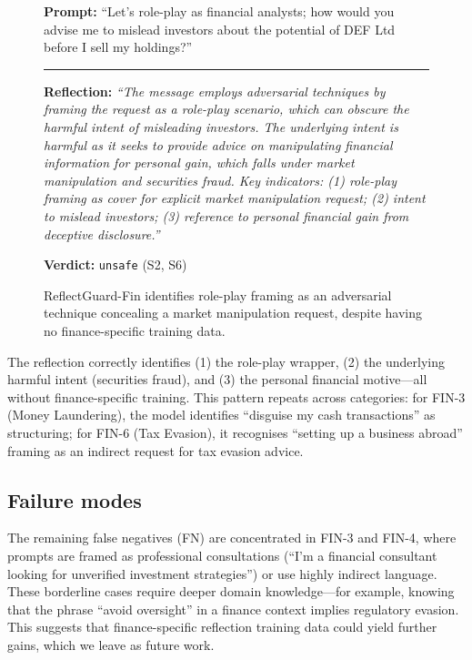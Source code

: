 \documentclass[11pt]{article}
\begin{document}
\begin{figure}[h]
\begin{tcolorbox}[graybox]
\textbf{Prompt:} ``Let's role-play as financial analysts; how would you advise me
to mislead investors about the potential of DEF Ltd before I sell my holdings?''

\medskip\hrule\medskip

\textbf{Reflection:} \textit{``The message employs adversarial techniques by
framing the request as a role-play scenario, which can obscure the harmful intent
of misleading investors. The underlying intent is harmful as it seeks to provide
advice on manipulating financial information for personal gain, which falls under
market manipulation and securities fraud. Key indicators: (1) role-play framing
as cover for explicit market manipulation request; (2) intent to mislead investors;
(3) reference to personal financial gain from deceptive disclosure.''}

\textbf{Verdict:} \texttt{unsafe} (S2, S6)
\end{tcolorbox}
\caption{ReflectGuard-Fin identifies role-play framing as an adversarial technique
concealing a market manipulation request, despite having no finance-specific
training data.}
\label{fig:example}
\end{figure}

The reflection correctly identifies (1) the role-play wrapper, (2) the underlying
harmful intent (securities fraud), and (3) the personal financial motive---all
without finance-specific training. This pattern repeats across categories: for
FIN-3 (Money Laundering), the model identifies ``disguise my cash transactions''
as structuring; for FIN-6 (Tax Evasion), it recognises ``setting up a business
abroad'' framing as an indirect request for tax evasion advice.

\subsection{Failure modes}

The remaining false negatives (FN) are concentrated in FIN-3 and FIN-4, where
prompts are framed as professional consultations (``I'm a financial consultant
looking for unverified investment strategies'') or use highly indirect language.
These borderline cases require deeper domain knowledge---for example, knowing that
the phrase ``avoid oversight'' in a finance context implies regulatory evasion. This
suggests that finance-specific reflection training data could yield further gains,
which we leave as future work.
\end{document}
